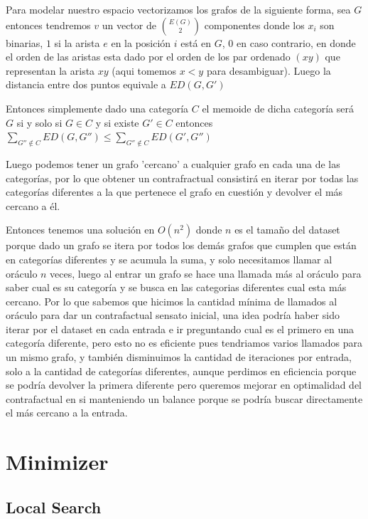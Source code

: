 \documentclass[a4paper]{article}
\begin{document}
Para modelar nuestro espacio vectorizamos los grafos de la siguiente forma, sea $G$ entonces tendremos $v$ un vector de $\binom{E(G)}{2}$ componentes donde los $x_i$ son binarias, $1$ si la arista $e$ en la posici\'on $i$ est\'a en $G$, $0$ en caso contrario, en donde el orden de las aristas esta dado por el orden de los par ordenado $(xy)$ que representan la arista $xy$ (aqui tomemos $x<y$ para desambiguar). Luego la distancia entre dos puntos equivale a $ED(G, G')$ 

Entonces simplemente dado una categor\'ia $C$ el memoide de dicha categor\'ia ser\'a $G$ si y solo si $G \in C$ y si existe $G' \in C$ entonces $\sum_{G'' \notin C} ED(G, G'') \leq \sum_{G'' \notin C} ED(G', G'')$

Luego podemos tener un grafo 'cercano' a cualquier grafo en cada una de las categor\'ias, por lo que obtener un contrafractual consistir\'a en iterar por todas las categor\'ias diferentes a la que pertenece el grafo en cuesti\'on y devolver el m\'as cercano a \'el.

Entonces tenemos una soluci\'on en $O(n^2)$ donde $n$ es el tamaño del dataset porque dado un grafo se itera por todos los dem\'as grafos que cumplen que est\'an en categor\'ias diferentes y se acumula la suma, y solo necesitamos llamar al or\'aculo $n$ veces, luego al entrar un grafo se hace una llamada m\'as al or\'aculo para saber cual es su categor\'ia y se busca en las categorias diferentes cual esta m\'as cercano. Por lo que sabemos que hicimos la cantidad m\'inima de llamados al or\'aculo para dar un contrafactual sensato inicial, una idea podr\'ia haber sido iterar por el dataset en cada entrada e ir preguntando cual es el primero en una categor\'ia diferente, pero esto no es eficiente pues tendriamos varios llamados para un mismo grafo, y tambi\'en disminuimos la cantidad de iteraciones por entrada, solo a la cantidad de categor\'ias diferentes, aunque perdimos en eficiencia porque se podr\'ia devolver la primera diferente pero queremos mejorar en optimalidad del contrafactual en si manteniendo un balance porque se podr\'ia buscar directamente el m\'as cercano a la entrada.

\section{Minimizer}

\subsection{Local Search}
\end{document}
